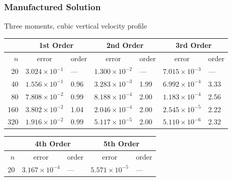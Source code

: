 \documentclass[10pt]{beamer}
\begin{document}
\begin{frame}
  \frametitle{Manufactured Solution}
  Three moments, cubic vertical velocity profile
  \footnotesize
  \begin{table}
    \centering
    \begin{tabular}{r*{6}l}
      \toprule
            & \multicolumn{2}{c}{1st Order} & \multicolumn{2}{c}{2nd Order} & \multicolumn{2}{c}{3rd Order}                                              \\
      \midrule
      \(n\) & \multicolumn{1}{c}{error}     & order                         & \multicolumn{1}{c}{error}     & order & \multicolumn{1}{c}{error}  & order \\
      \midrule
      20    & \( 3.024 \times 10^{-1} \)    & ---                           & \( 1.300 \times 10^{-2} \)    & ---   & \( 7.015 \times 10^{-3} \) & ---   \\
      40    & \( 1.556 \times 10^{-1} \)    & 0.96                          & \( 3.283 \times 10^{-3} \)    & 1.99  & \( 6.992 \times 10^{-4} \) & 3.33  \\
      80    & \( 7.808 \times 10^{-2} \)    & 0.99                          & \( 8.188 \times 10^{-4} \)    & 2.00  & \( 1.183 \times 10^{-4} \) & 2.56  \\
      160   & \( 3.802 \times 10^{-2} \)    & 1.04                          & \( 2.046 \times 10^{-4} \)    & 2.00  & \( 2.545 \times 10^{-5} \) & 2.22  \\
      320   & \( 1.916 \times 10^{-2} \)    & 0.99                          & \( 5.117 \times 10^{-5} \)    & 2.00  & \( 5.110 \times 10^{-6} \) & 2.32  \\
      \bottomrule
    \end{tabular}
  \end{table}
  \begin{table}
    \centering
    \begin{tabular}{r*{4}l}
      \toprule
            & \multicolumn{2}{c}{4th Order} & \multicolumn{2}{c}{5th Order}                                       \\
      \midrule
      \(n\) & \multicolumn{1}{c}{error}     & order                         & \multicolumn{1}{c}{error}   & order \\
      \midrule
      20    & \( 3.167 \times 10^{ -4} \)   & ---                           & \( 5.571 \times 10^{ -5} \) & ---   \\

\end{tabular}
\end{table}
\end{frame}
\end{document}
